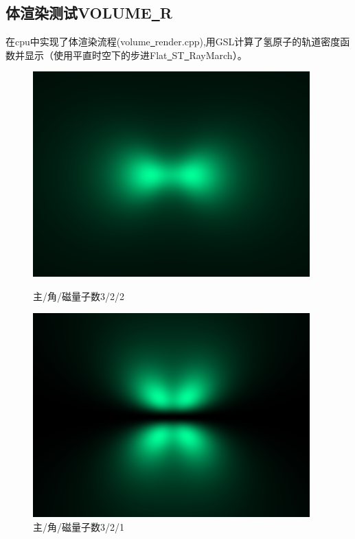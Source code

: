 \documentclass[a4paper, 12pt]{article}
\begin{document}
    \subsection{体渲染测试VOLUME\underline \ R}
    在cpu中实现了体渲染流程(volume\underline \ render.cpp),用GSL计算了氢原子的轨道密度函数并显示（使用平直时空下的步进Flat\underline \ ST\underline \ RayMarch）。
    \begin{figure}[H]
    \centering
    \begin{minipage}[t]{0.48\textwidth}
        \centering
        \includegraphics[width=0.95\textwidth]{photo/322x025.png}
        \caption{主/角/磁量子数3/2/2}
    \end{minipage}
    \hfill
    \begin{minipage}[t]{0.48\textwidth}
        \centering
        \includegraphics[width=0.95\textwidth]{photo/321x025.png}
        \caption{主/角/磁量子数3/2/1}
    \end{minipage}
\end{figure}
\end{document}
